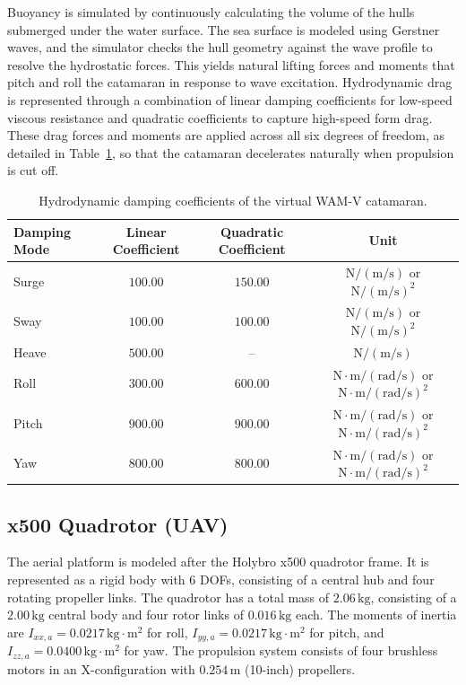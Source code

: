     Buoyancy is simulated by continuously calculating the volume of the hulls submerged under the water surface. The sea surface is modeled using Gerstner waves, and the simulator checks the hull geometry against the wave profile to resolve the hydrostatic forces. This yields natural lifting forces and moments that pitch and roll the catamaran in response to wave excitation. Hydrodynamic drag is represented through a combination of linear damping coefficients for low-speed viscous resistance and quadratic coefficients to capture high-speed form drag. These drag forces and moments are applied across all six degrees of freedom, as detailed in Table~\ref{tab:usv_damping_parameters}, so that the catamaran decelerates naturally when propulsion is cut off.

    \begin{table}[H]
        \centering
        \caption{Hydrodynamic damping coefficients of the virtual WAM-V catamaran.}
        \label{tab:usv_damping_parameters}
        \begin{tabular}{lccc}
            \toprule
            \textbf{Damping Mode} & \textbf{Linear Coefficient} & \textbf{Quadratic Coefficient} & \textbf{Unit} \\
            \midrule
            Surge & $100.00$ & $150.00$ & $\text{N}/(\text{m/s})$ or $\text{N}/(\text{m/s})^2$ \\
            Sway & $100.00$ & $100.00$ & $\text{N}/(\text{m/s})$ or $\text{N}/(\text{m/s})^2$ \\
            Heave & $500.00$ & -- & $\text{N}/(\text{m/s})$ \\
            Roll & $300.00$ & $600.00$ & $\text{N}\cdot\text{m}/(\text{rad/s})$ or $\text{N}\cdot\text{m}/(\text{rad/s})^2$ \\
            Pitch & $900.00$ & $900.00$ & $\text{N}\cdot\text{m}/(\text{rad/s})$ or $\text{N}\cdot\text{m}/(\text{rad/s})^2$ \\
            Yaw & $800.00$ & $800.00$ & $\text{N}\cdot\text{m}/(\text{rad/s})$ or $\text{N}\cdot\text{m}/(\text{rad/s})^2$ \\
            \bottomrule
        \end{tabular}
    \end{table}

    \subsection{x500 Quadrotor (UAV)}
    \label{sec:uav_model}
    The aerial platform is modeled after the Holybro x500 quadrotor frame. It is represented as a rigid body with 6 DOFs, consisting of a central hub and four rotating propeller links. The quadrotor has a total mass of $2.06\,\text{kg}$, consisting of a $2.00\,\text{kg}$ central body and four rotor links of $0.016\,\text{kg}$ each. The moments of inertia are $I_{xx,a} = 0.0217\,\text{kg}\cdot\text{m}^2$ for roll, $I_{yy,a} = 0.0217\,\text{kg}\cdot\text{m}^2$ for pitch, and $I_{zz,a} = 0.0400\,\text{kg}\cdot\text{m}^2$ for yaw. The propulsion system consists of four brushless motors in an X-configuration with $0.254\,\text{m}$ (10-inch) propellers.
    
